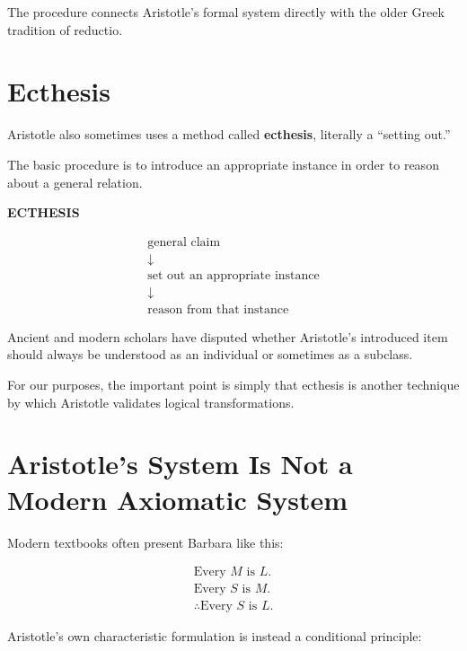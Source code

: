 \documentclass[11pt]{article}
\begin{document}
The procedure connects Aristotle's formal system directly with
the older Greek tradition of reductio.

\section{Ecthesis}

Aristotle also sometimes uses a method called
\textbf{ecthesis}, literally a ``setting out.''

The basic procedure is to introduce an appropriate instance in
order to reason about a general relation.

\begin{whiteboard}
\textbf{ECTHESIS}

\[
\begin{array}{c}
\text{general claim}\\
\downarrow\\
\text{set out an appropriate instance}\\
\downarrow\\
\text{reason from that instance}
\end{array}
\]
\end{whiteboard}

Ancient and modern scholars have disputed whether Aristotle's
introduced item should always be understood as an individual or
sometimes as a subclass.

For our purposes, the important point is simply that ecthesis is
another technique by which Aristotle validates logical
transformations.

\section{Aristotle's System Is Not a Modern Axiomatic System}

Modern textbooks often present Barbara like this:

\[
\begin{array}{l}
\text{Every }M\text{ is }L.\\
\text{Every }S\text{ is }M.\\
\hline
\therefore\text{Every }S\text{ is }L.
\end{array}
\]

Aristotle's own characteristic formulation is instead a
conditional principle:
\end{document}
